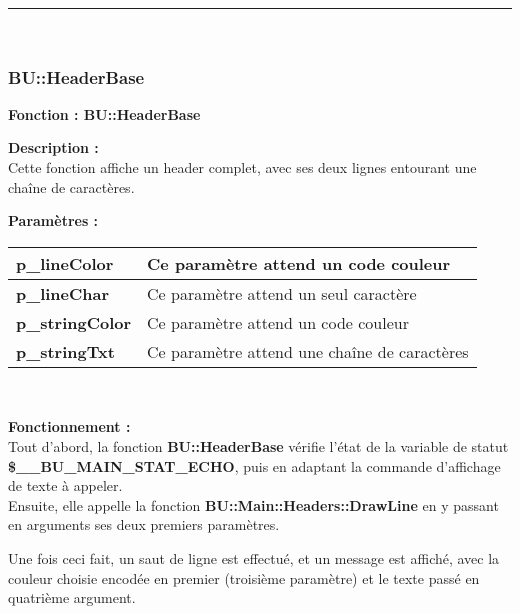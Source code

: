 \documentclass[a4paper,10pt]{article}
\begin{document}
\color{blue}\par\noindent\rule{\textwidth}{0.4pt}\color{white}\\[1\baselineskip]

\color{blue}
\subsubsection{BU::HeaderBase}\color{white}

\textbf{Fonction : \color{mauve}BU::HeaderBase}\\[1\baselineskip]

\begin{justify}
    \textbf{Description :}\\
    Cette fonction affiche un header complet, avec ses deux lignes entourant une chaîne de caractères.
\end{justify}

\textbf{Paramètres :}\\[1\baselineskip]
\begin{tabular}{|l|l|}
\hline 
\textbf{\color{orange}p\_lineColor} & Ce paramètre attend un code couleur \\ 
\hline 
\textbf{\color{orange}p\_lineChar} & Ce paramètre attend un seul caractère \\ 
\hline 
\textbf{\color{orange}p\_stringColor} & Ce paramètre attend un code couleur \\ 
\hline 
\textbf{\color{orange}p\_stringTxt} & Ce paramètre attend une chaîne de caractères\\ 
\hline 
\end{tabular}\\[1\baselineskip]

\begin{justify}
    \textbf{Fonctionnement :}\\
    Tout d'abord, la fonction \textbf{\color{mauve}BU::HeaderBase} vérifie l'état de la variable de statut \textbf{\color{orange}\$\_\_BU\_MAIN\_STAT\_ECHO}, puis en adaptant la commande d'affichage de texte à appeler.\\[1\baselineskip]

    Ensuite, elle appelle la fonction \textbf{\color{mauve}BU::Main::Headers::DrawLine} en y passant en arguments ses deux premiers paramètres.
\end{justify}

\begin{justify}
    Une fois ceci fait, un saut de ligne est effectué, et un message est affiché, avec la couleur choisie encodée en premier (troisième paramètre) et le texte passé en quatrième argument.
\end{justify}
\end{document}
